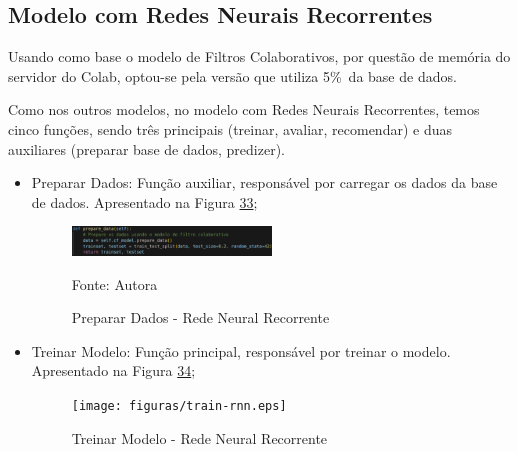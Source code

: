 \subsection{Modelo com Redes Neurais Recorrentes}\label{subsec:rnr}

Usando como base o modelo de Filtros Colaborativos, por questão de memória do servidor do Colab, optou-se pela
versão que utiliza 5\%\ da base de dados.

Como nos outros modelos, no modelo com Redes Neurais Recorrentes, temos cinco funções, 
sendo três principais (treinar, avaliar, recomendar) e duas auxiliares (preparar base de dados, predizer).

\begin{itemize}
    \item Preparar Dados: Função auxiliar, responsável por carregar os dados da base de dados.
    Apresentado na Figura \hyperref[fig:prepdata-rnn]{33};
    \begin{figure}[htbp]
        \centering
        \caption{Preparar Dados - Rede Neural Recorrente}
        \label{fig:prepdata-rnn}
        
        \vspace{2pt} %
        
        \includegraphics[width=0.5\textwidth]{figuras/prepdata-rnn.eps}
        
        \vspace{2pt} %
        
        \small Fonte: Autora
    \end{figure}

    \item Treinar Modelo: Função principal, responsável por treinar o modelo. Apresentado na Figura \hyperref[fig:train-rnn]{34};
    \begin{figure}[htbp]
        \centering
        \caption{Treinar Modelo - Rede Neural Recorrente}
        \label{fig:train-rnn}
        
        \vspace{2pt} %
        
        \texttt{[image: figuras/train-rnn.eps]}
        
        \vspace{2pt} %
        

\end{figure}
\end{itemize}
